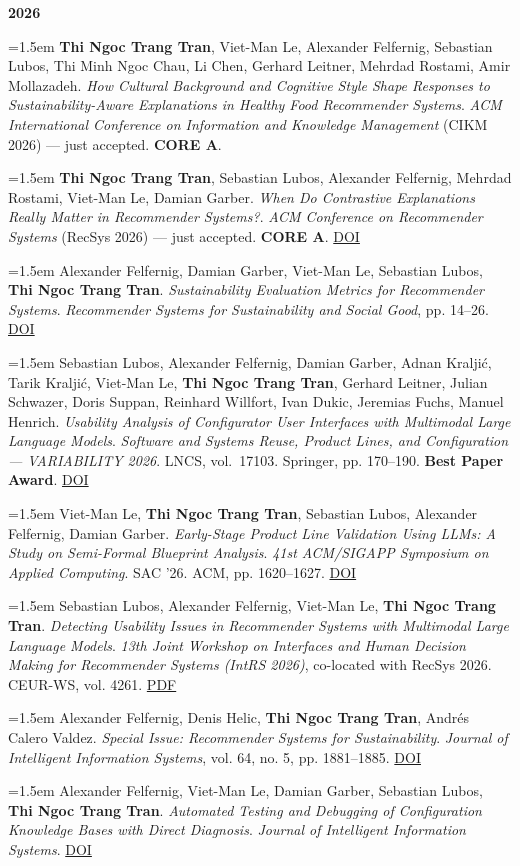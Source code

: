 \documentclass[11pt,a4paper]{article}
\newcommand{\pub}[1]{%
  \par\noindent\hangindent=1.5em\hangafter=1 #1\par\vspace{0.5ex}}
\newcommand{\pubyear}[1]{\vspace{0.7ex}\par\noindent\textbf{#1}\par\vspace{0.2ex}}
\begin{document}
\pubyear{2026}
\pub{\textbf{Thi Ngoc Trang Tran}, Viet-Man Le, Alexander Felfernig, Sebastian Lubos, Thi Minh Ngoc Chau, Li Chen, Gerhard Leitner, Mehrdad Rostami, Amir Mollazadeh. \textit{How Cultural Background and Cognitive Style Shape Responses to Sustainability-Aware Explanations in Healthy Food Recommender Systems}. \textit{ACM International Conference on Information and Knowledge Management} (CIKM 2026) — just accepted. \textbf{CORE A}.}
\pub{\textbf{Thi Ngoc Trang Tran}, Sebastian Lubos, Alexander Felfernig, Mehrdad Rostami, Viet-Man Le, Damian Garber. \textit{When Do Contrastive Explanations Really Matter in Recommender Systems?}. \textit{ACM Conference on Recommender Systems} (RecSys 2026) — just accepted. \textbf{CORE A}. \href{https://dl.acm.org/doi/10.1145/3773078.3831752}{DOI}}
\pub{Alexander Felfernig, Damian Garber, Viet-Man Le, Sebastian Lubos, \textbf{Thi Ngoc Trang Tran}. \textit{Sustainability Evaluation Metrics for Recommender Systems}. \textit{Recommender Systems for Sustainability and Social Good}, pp. 14–26. \href{https://doi.org/10.1007/978-3-032-13342-7_2}{DOI}}
\pub{Sebastian Lubos, Alexander Felfernig, Damian Garber, Adnan Kralji\'c, Tarik Kralji\'c, Viet-Man Le, \textbf{Thi Ngoc Trang Tran}, Gerhard Leitner, Julian Schwazer, Doris Suppan, Reinhard Willfort, Ivan Dukic, Jeremias Fuchs, Manuel Henrich. \textit{Usability Analysis of Configurator User Interfaces with Multimodal Large Language Models}. \textit{Software and Systems Reuse, Product Lines, and Configuration --- VARIABILITY 2026}. LNCS, vol.\ 17103. Springer, pp. 170–190. \textbf{Best Paper Award}. \href{https://doi.org/10.1007/978-3-032-40763-4_10}{DOI}}
\pub{Viet-Man Le, \textbf{Thi Ngoc Trang Tran}, Sebastian Lubos, Alexander Felfernig, Damian Garber. \textit{Early-Stage Product Line Validation Using LLMs: A Study on Semi-Formal Blueprint Analysis}. \textit{41st ACM/SIGAPP Symposium on Applied Computing}. SAC '26. ACM, pp. 1620–1627. \href{https://doi.org/10.1145/3748522.3779903}{DOI}}
\pub{Sebastian Lubos, Alexander Felfernig, Viet-Man Le, \textbf{Thi Ngoc Trang Tran}. \textit{Detecting Usability Issues in Recommender Systems with Multimodal Large Language Models}. \textit{13th Joint Workshop on Interfaces and Human Decision Making for Recommender Systems (IntRS 2026)}, co-located with RecSys 2026. CEUR-WS, vol. 4261. \href{https://ceur-ws.org/Vol-4261/short3.pdf}{PDF}}
\pub{Alexander Felfernig, Denis Helic, \textbf{Thi Ngoc Trang Tran}, Andr\'es Calero Valdez. \textit{Special Issue: Recommender Systems for Sustainability}. \textit{Journal of Intelligent Information Systems}, vol. 64, no. 5, pp. 1881–1885. \href{https://doi.org/10.1007/s10844-026-01091-2}{DOI}}
\pub{Alexander Felfernig, Viet-Man Le, Damian Garber, Sebastian Lubos, \textbf{Thi Ngoc Trang Tran}. \textit{Automated Testing and Debugging of Configuration Knowledge Bases with Direct Diagnosis}. \textit{Journal of Intelligent Information Systems}. \href{https://doi.org/10.1007/s10844-026-01090-3}{DOI}}
\end{document}
